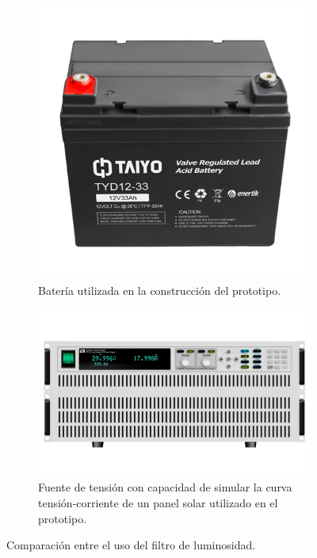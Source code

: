 \begin{figure}[H]
\centering
    	\begin{subfigure}{0.49\textwidth}
        	\centering
        	\includegraphics[width=\linewidth]{ImagenesConstruccion del prototipo/bateria_prototipo}		
			\caption{Batería utilizada en la construcción del prototipo.}
			\label{fig:bateria_prototipo}
        \end{subfigure}\hfill
        \begin{subfigure}{0.49\textwidth}
        	\centering
        	\includegraphics[width=\linewidth]{ImagenesConstruccion del prototipo/fuente_prototipo}
        	\caption{Fuente de tensión con capacidad de simular la curva tensión-corriente de un panel solar utilizado en el prototipo.}
			\label{fig:fuente_prototipo}
        \end{subfigure}
	\caption{Comparación entre el uso del filtro de luminosidad.}
	\label{fig:elementos_prototipo}
\end{figure}

